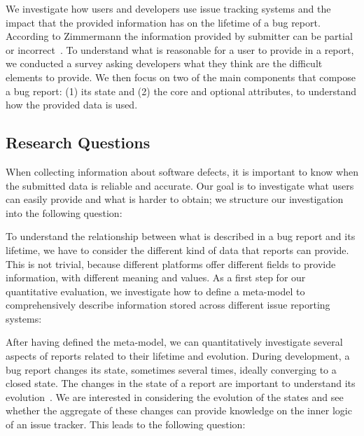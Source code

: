 We investigate how users and developers use issue tracking systems and the impact that the provided information has on the lifetime of a bug report. According to Zimmermann \etal the information provided by submitter can be partial or incorrect~\cite{Zimm2010}. To understand what is reasonable for a user to provide in a report, we conducted a survey asking developers what they think are the difficult elements to provide. We then focus on two of the main components that compose a bug report: (1) its state and (2) the core and optional attributes, to understand how the provided data is used.

\subsection{Research Questions} \label{sec:questions}

When collecting information about software defects, it is important to know when the submitted data is reliable and accurate. Our goal is to investigate what  users can easily provide and what is harder to obtain; we structure our investigation into the following question:


To understand the relationship between what is described in a bug report and its lifetime, we have to consider the different kind of data that reports can provide. This is not trivial, because different platforms offer different fields to provide information, with different meaning and values. As a first step for our quantitative evaluation, we investigate how to define a meta-model to comprehensively describe information stored across different issue reporting systems:


After having defined the meta-model, we can quantitatively investigate several aspects of reports related to their lifetime and evolution.
During development, a bug report changes its state, sometimes several times, ideally converging to a closed state. The changes in the state of a report are important to understand its evolution~\cite{DAmb2007b}. We are interested in considering the evolution of the states and see whether the aggregate of these changes can provide knowledge on the inner logic of an issue tracker. This leads to the following question:

